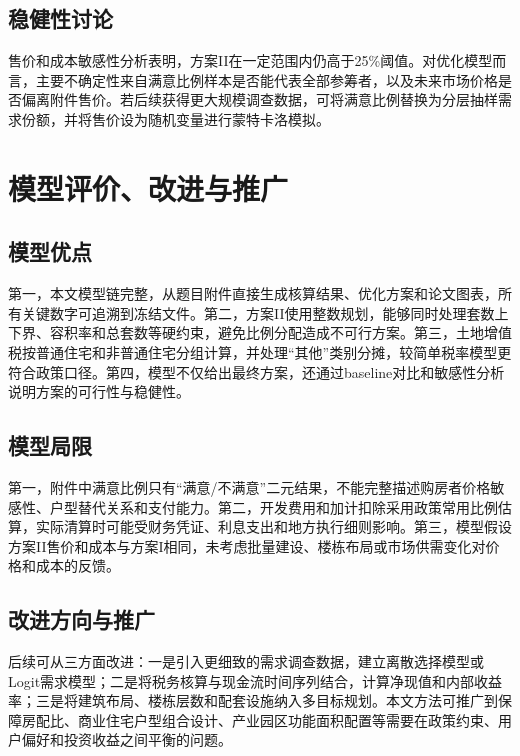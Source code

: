 \documentclass[UTF8,12pt,a4paper]{ctexart}
\begin{document}
\subsection{稳健性讨论}
售价和成本敏感性分析表明，方案II在一定范围内仍高于25\%阈值。对优化模型而言，主要不确定性来自满意比例样本是否能代表全部参筹者，以及未来市场价格是否偏离附件售价。若后续获得更大规模调查数据，可将满意比例替换为分层抽样需求份额，并将售价设为随机变量进行蒙特卡洛模拟。

\section{模型评价、改进与推广}
\subsection{模型优点}
第一，本文模型链完整，从题目附件直接生成核算结果、优化方案和论文图表，所有关键数字可追溯到冻结文件。第二，方案II使用整数规划，能够同时处理套数上下界、容积率和总套数等硬约束，避免比例分配造成不可行方案。第三，土地增值税按普通住宅和非普通住宅分组计算，并处理“其他”类别分摊，较简单税率模型更符合政策口径。第四，模型不仅给出最终方案，还通过baseline对比和敏感性分析说明方案的可行性与稳健性。

\subsection{模型局限}
第一，附件中满意比例只有“满意/不满意”二元结果，不能完整描述购房者价格敏感性、户型替代关系和支付能力。第二，开发费用和加计扣除采用政策常用比例估算，实际清算时可能受财务凭证、利息支出和地方执行细则影响。第三，模型假设方案II售价和成本与方案I相同，未考虑批量建设、楼栋布局或市场供需变化对价格和成本的反馈。

\subsection{改进方向与推广}
后续可从三方面改进：一是引入更细致的需求调查数据，建立离散选择模型或Logit需求模型；二是将税务核算与现金流时间序列结合，计算净现值和内部收益率；三是将建筑布局、楼栋层数和配套设施纳入多目标规划。本文方法可推广到保障房配比、商业住宅户型组合设计、产业园区功能面积配置等需要在政策约束、用户偏好和投资收益之间平衡的问题。
\end{document}
